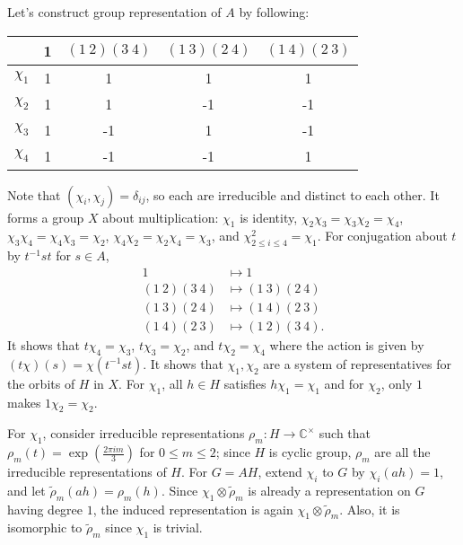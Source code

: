 \documentclass[a4paper, 12pt]{article}
\theoremstyle{Mydefinition}
\theoremstyle{Mytheorem}
\begin{document}
\begin{enumerate}
    Let's construct group representation of $A$ by following:
    \begin{center}
    \begin{tabular}{c|cccc}
      & 1 & $(1~2)(3~4)$ & $(1~3)(2~4)$ & $(1~4)(2~3)$ \\ \hline
    $\chi_1$ & 1 & 1  & 1  & 1  \\
    $\chi_2$ & 1 & 1  & -1 & -1 \\
    $\chi_3$ & 1 & -1 & 1  & -1 \\
    $\chi_4$ & 1 & -1 & -1 & 1  \\ \hline
    \end{tabular}
    \end{center}
    Note that $(\chi_i,\chi_j) = \delta_{ij}$, so each are irreducible and distinct to each other. It forms a group $X$ about multiplication: $\chi_1$ is identity, $\chi_2\chi_3 =\chi_3\chi_2= \chi_4$, $\chi_3\chi_4 = \chi_4\chi_3 = \chi_2$, $\chi_4\chi_2 =\chi_2\chi_4= \chi_3$, and $\chi_{2\leq i\leq 4}^2 = \chi_1$. For conjugation about $t$ by $t^{-1}st$ for $s\in A$,
    \begin{equation}
    \begin{split}
    1&\mapsto 1\\
    (1~2)(3~4)&\mapsto (1~3)(2~4)\\
    (1~3)(2~4)&\mapsto (1~4)(2~3)\\
    (1~4)(2~3)&\mapsto (1~2)(3~4).
    \end{split}
    \end{equation}
    It shows that $t\chi_4 = \chi_3$, $t\chi_3 = \chi_2$, and $t\chi_2 = \chi_4$ where the action is given by $(t\chi)(s) = \chi(t^{-1}st)$. It shows that $\chi_1,\chi_2$ are a system of representatives for the orbits of $H$ in $X$. For $\chi_1$, all $h\in H$ satisfies $h\chi_1 = \chi_1$ and for $\chi_2$, only $1$ makes $1\chi_2 = \chi_2$.
    
    For $\chi_1$, consider irreducible representations $\rho_m:H\rightarrow \mathbb{C}^\times$ such that $\rho_m(t) = \exp\left(\frac{2\pi i m}{3}\right)$ for $0\leq m\leq 2$; since $H$ is cyclic group, $\rho_m$ are all the irreducible representations of $H$. For $G=AH$, extend $\chi_i$ to $G$ by $\chi_i(ah) = 1$, and let $\tilde{\rho}_m(ah) = \rho_m(h)$. Since $\chi_1\otimes \tilde{\rho}_m$ is already a representation on $G$ having degree $1$, the induced representation is again $\chi_1\otimes \tilde{\rho}_m$. Also, it is isomorphic to $\tilde{\rho}_m$ since $\chi_1$ is trivial.
    

\end{enumerate}
\end{document}
